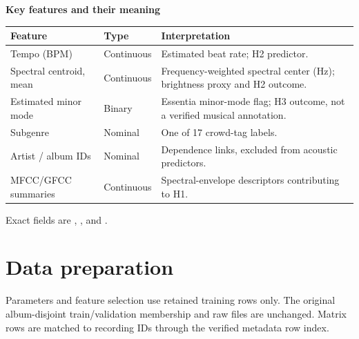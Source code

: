 \documentclass[10pt,a4paper,twocolumn]{article}
\newcommand{\minihead}[1]{\par\needspace{6\baselineskip}\smallskip\textbf{#1}\par}
\begin{document}
\minihead{Key features and their meaning}
{\small\begin{tabularx}{\linewidth}{@{}L{2.25cm} L{1.65cm} Y@{}}\toprule
Feature & Type & Interpretation\\\midrule
Tempo (BPM) & Continuous & Estimated beat rate; H2 predictor.\\
Spectral centroid, mean & Continuous & Frequency-weighted spectral center (Hz); brightness proxy and H2 outcome.\\
Estimated minor mode & Binary & Essentia minor-mode flag; H3 outcome, not a verified musical annotation.\\
Subgenre & Nominal & One of 17 crowd-tag labels.\\
Artist / album IDs & Nominal & Dependence links, excluded from acoustic predictors.\\
MFCC/GFCC summaries & Continuous & Spectral-envelope descriptors contributing to H1.\\\bottomrule
\end{tabularx}}
Exact fields are , , and .

\section{Data preparation}
Parameters and feature selection use retained training rows only. The original album-disjoint train/validation membership and raw files are unchanged. Matrix rows are matched to recording IDs through the verified metadata row index.
\end{document}
